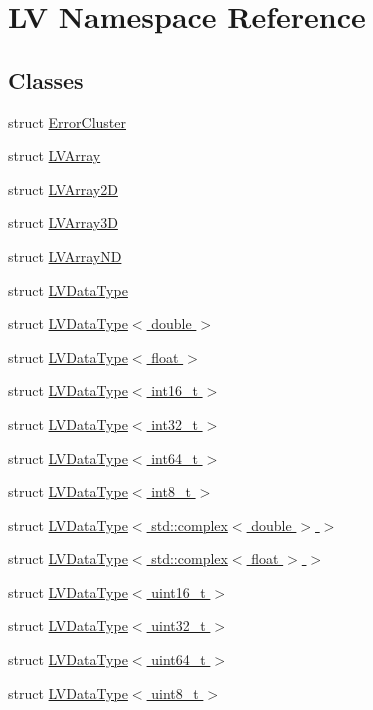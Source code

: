 \hypertarget{namespace_l_v}{}\section{LV Namespace Reference}
\label{namespace_l_v}
\subsection*{Classes}
\begin{DoxyCompactItemize}
\item 
struct \hyperlink{struct_l_v_1_1_error_cluster}{Error\+Cluster}
\item 
struct \hyperlink{struct_l_v_1_1_l_v_array}{L\+V\+Array}
\item 
struct \hyperlink{struct_l_v_1_1_l_v_array2_d}{L\+V\+Array2D}
\item 
struct \hyperlink{struct_l_v_1_1_l_v_array3_d}{L\+V\+Array3D}
\item 
struct \hyperlink{struct_l_v_1_1_l_v_array_n_d}{L\+V\+Array\+ND}
\item 
struct \hyperlink{struct_l_v_1_1_l_v_data_type}{L\+V\+Data\+Type}
\item 
struct \hyperlink{struct_l_v_1_1_l_v_data_type_3_01double_01_4}{L\+V\+Data\+Type$<$ double $>$}
\item 
struct \hyperlink{struct_l_v_1_1_l_v_data_type_3_01float_01_4}{L\+V\+Data\+Type$<$ float $>$}
\item 
struct \hyperlink{struct_l_v_1_1_l_v_data_type_3_01int16__t_01_4}{L\+V\+Data\+Type$<$ int16\+\_\+t $>$}
\item 
struct \hyperlink{struct_l_v_1_1_l_v_data_type_3_01int32__t_01_4}{L\+V\+Data\+Type$<$ int32\+\_\+t $>$}
\item 
struct \hyperlink{struct_l_v_1_1_l_v_data_type_3_01int64__t_01_4}{L\+V\+Data\+Type$<$ int64\+\_\+t $>$}
\item 
struct \hyperlink{struct_l_v_1_1_l_v_data_type_3_01int8__t_01_4}{L\+V\+Data\+Type$<$ int8\+\_\+t $>$}
\item 
struct \hyperlink{struct_l_v_1_1_l_v_data_type_3_01std_1_1complex_3_01double_01_4_01_4}{L\+V\+Data\+Type$<$ std\+::complex$<$ double $>$ $>$}
\item 
struct \hyperlink{struct_l_v_1_1_l_v_data_type_3_01std_1_1complex_3_01float_01_4_01_4}{L\+V\+Data\+Type$<$ std\+::complex$<$ float $>$ $>$}
\item 
struct \hyperlink{struct_l_v_1_1_l_v_data_type_3_01uint16__t_01_4}{L\+V\+Data\+Type$<$ uint16\+\_\+t $>$}
\item 
struct \hyperlink{struct_l_v_1_1_l_v_data_type_3_01uint32__t_01_4}{L\+V\+Data\+Type$<$ uint32\+\_\+t $>$}
\item 
struct \hyperlink{struct_l_v_1_1_l_v_data_type_3_01uint64__t_01_4}{L\+V\+Data\+Type$<$ uint64\+\_\+t $>$}
\item 
struct \hyperlink{struct_l_v_1_1_l_v_data_type_3_01uint8__t_01_4}{L\+V\+Data\+Type$<$ uint8\+\_\+t $>$}
\end{DoxyCompactItemize}
